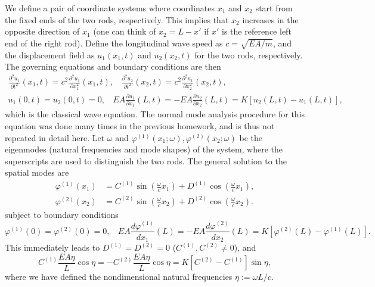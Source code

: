 We define a pair of coordinate systems where coordinates $x_1$ and $x_2$ start from the fixed ends of the two rods, respectively.
This implies that $x_2$ increases in the opposite direction of $x_1$ (one can think of $x_2 = L - x'$ if $x'$ is the reference left end of the right rod).
Define the longitudinal wave speed as $c = \sqrt{EA/m}$, and the displacement field as $u_1(x_1, t)$ and $u_2(x_2, t)$ for the two rods, respectively.
The governing equations and boundary conditions are then 
\begin{equation}
\begin{gathered}
    \frac{\partial^2 u_1}{\partial t^2}(x_1, t) = c^2 \frac{\partial^2 u_1}{\partial x_1^2}(x_1, t), ~~~~ 
    \frac{\partial^2 u_2}{\partial t^2}(x_2, t) = c^2 \frac{\partial^2 u_1}{\partial x_2^2}(x_2, t), \\
    u_1(0, t) = u_2(0, t) = 0, ~~~~ 
    EA \frac{\partial u_1}{\partial x_1}(L, t) = -EA \frac{\partial u_2}{\partial x_2}(L, t) = K \left[ u_2(L, t) - u_1(L, t) \right],
\end{gathered}
\end{equation}
which is the classical wave equation.
The normal mode analysis procedure for this equation was done many times in the previous homework, and is thus not repeated in detail here. 
Let $\omega$ and $\varphi^{(1)}(x_1; \omega), \varphi^{(2)}(x_2; \omega)$ be the eigenmodes (natural frequencies and mode shapes) of the system, where the superscripts are used to distinguish the two rods.
The general solution to the spatial modes are 
\begin{equation}
\begin{aligned}
    \varphi^{(1)}(x_1) &= C^{(1)} \sin \left( \frac{\omega}{c} x_1 \right) + D^{(1)} \cos \left( \frac{\omega}{c} x_1 \right), \\
    \varphi^{(2)}(x_2) &= C^{(2)} \sin \left( \frac{\omega}{c} x_2 \right) + D^{(2)} \cos \left( \frac{\omega}{c} x_2 \right).
\end{aligned}
\end{equation}
subject to boundary conditions 
\begin{equation}
    \varphi^{(1)}(0) = \varphi^{(2)}(0) = 0, ~~~~ EA \frac{d\varphi^{(1)}}{dx_1}(L) = -EA \frac{d\varphi^{(2)}}{dx_2}(L) = K \left[ \varphi^{(2)}(L) - \varphi^{(1)}(L) \right].
\end{equation}
This immediately leads to $D^{(1)} = D^{(2)} = 0$ ($C^{(1)}, C^{(2)} \neq 0$), and 
\begin{equation}\label{eqn:hw3_p1_eigen_bc}
    C^{(1)}\frac{EA\eta}{L} \cos\eta = -C^{(2)}\frac{EA\eta}{L} \cos\eta = K \left[ C^{(2)} - C^{(1)} \right] \sin\eta,
\end{equation}
where we have defined the nondimensional natural frequencies $\eta := \omega L / c$.

